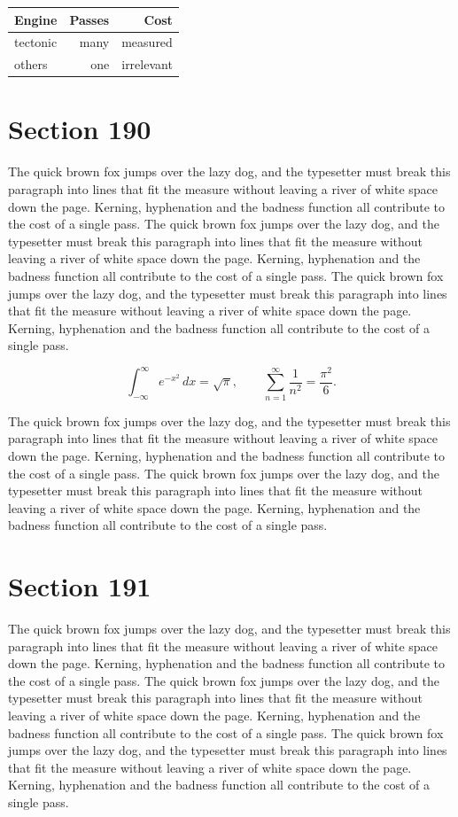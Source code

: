 \documentclass{article}
\begin{document}
\begin{center}
\begin{tabular}{lrr}
\toprule
Engine & Passes & Cost \\
\midrule
tectonic & many & measured \\
others & one & irrelevant \\
\bottomrule
\end{tabular}
\end{center}

\section{Section 190}
The quick brown fox jumps over the lazy dog, and the typesetter must break this paragraph into lines that fit the measure without leaving a river of white space down the page. Kerning, hyphenation and the badness function all contribute to the cost of a single pass. The quick brown fox jumps over the lazy dog, and the typesetter must break this paragraph into lines that fit the measure without leaving a river of white space down the page. Kerning, hyphenation and the badness function all contribute to the cost of a single pass. The quick brown fox jumps over the lazy dog, and the typesetter must break this paragraph into lines that fit the measure without leaving a river of white space down the page. Kerning, hyphenation and the badness function all contribute to the cost of a single pass. 

\begin{equation}
\int_{-\infty}^{\infty} e^{-x^{2}}\,dx = \sqrt{\pi}, \qquad
\sum_{n=1}^{\infty} \frac{1}{n^{2}} = \frac{\pi^{2}}{6}.
\end{equation}

The quick brown fox jumps over the lazy dog, and the typesetter must break this paragraph into lines that fit the measure without leaving a river of white space down the page. Kerning, hyphenation and the badness function all contribute to the cost of a single pass. The quick brown fox jumps over the lazy dog, and the typesetter must break this paragraph into lines that fit the measure without leaving a river of white space down the page. Kerning, hyphenation and the badness function all contribute to the cost of a single pass. 
\section{Section 191}
The quick brown fox jumps over the lazy dog, and the typesetter must break this paragraph into lines that fit the measure without leaving a river of white space down the page. Kerning, hyphenation and the badness function all contribute to the cost of a single pass. The quick brown fox jumps over the lazy dog, and the typesetter must break this paragraph into lines that fit the measure without leaving a river of white space down the page. Kerning, hyphenation and the badness function all contribute to the cost of a single pass. The quick brown fox jumps over the lazy dog, and the typesetter must break this paragraph into lines that fit the measure without leaving a river of white space down the page. Kerning, hyphenation and the badness function all contribute to the cost of a single pass. 
\end{document}
